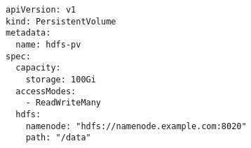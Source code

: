 \begin{verbatim}
apiVersion: v1
kind: PersistentVolume
metadata:
  name: hdfs-pv
spec:
  capacity:
    storage: 100Gi
  accessModes:
    - ReadWriteMany
  hdfs:
    namenode: "hdfs://namenode.example.com:8020"
    path: "/data"
\end{verbatim}